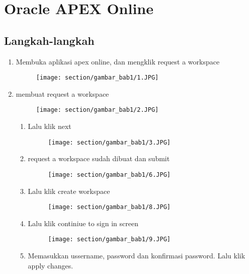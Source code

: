 \chapter{Oracle APEX Online}

\section{Langkah-langkah}
\begin{enumerate}
    \item Membuka aplikasi apex online, dan mengklik request a workspace
\begin{figure}[!htbp]
    \centering
    \texttt{[image: section/gambar\_bab1/1.JPG]}
    \label{penanda}
\end{figure}
    \item membuat request a workspace
\begin{figure}[!htbp]
    \centering
    \texttt{[image: section/gambar\_bab1/2.JPG]}
    \label{penanda}
\end{figure}
\begin{enumerate}
    \item Lalu klik next
\begin{figure}[!htbp]
    \centering
    \texttt{[image: section/gambar\_bab1/3.JPG]}
    \label{penanda}
\end{figure}
    \item request a workspace sudah dibuat dan submit
\begin{figure}[!htbp]
    \centering
    \texttt{[image: section/gambar\_bab1/6.JPG]}
    \label{penanda}
\end{figure}   
\vspace{6cm}
    \item Lalu klik create workspace
\begin{figure}[!htbp]
    \centering
    \texttt{[image: section/gambar\_bab1/8.JPG]}
    \label{penanda}
\end{figure} 
\vspace{5cm}
    \item Lalu klik continiue to sign in screen
\begin{figure}[!htbp]
    \centering
    \texttt{[image: section/gambar\_bab1/9.JPG]}
    \label{penanda}
\end{figure}
\vspace{6cm}
    \item Memasukkan ussername, password dan konfirmasi password. Lalu klik apply changes.
\vspace{3cm}

\end{enumerate}
\end{enumerate}

